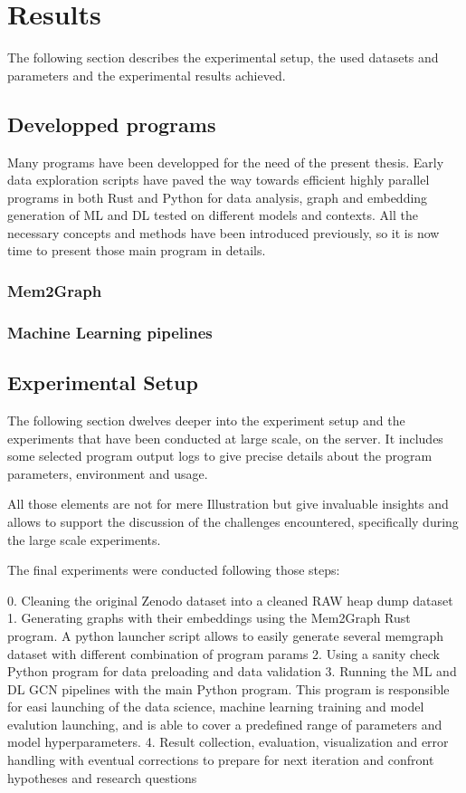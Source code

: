 \chapter{Results}\label{chap:results}

The following section describes the experimental setup, the used datasets and parameters and the experimental results achieved.

\section{Developped programs}
Many programs have been developped for the need of the present thesis. Early data exploration scripts have paved the way towards efficient highly parallel programs in both Rust and Python for data analysis, graph and embedding generation of ML and DL tested on different models and contexts. All the necessary concepts and methods have been introduced previously, so it is now time to present those main program in details.

\subsection{Mem2Graph}

\subsection{Machine Learning pipelines}

\section{Experimental Setup}
The following section dwelves deeper into the experiment setup and the experiments that have been conducted at large scale, on the server. It includes some selected program output logs to give precise details about the program parameters, environment and usage. 

All those elements are not for mere Illustration but give invaluable insights and allows to support the discussion of the challenges encountered, specifically during the large scale experiments.

The final experiments were conducted following those steps:

0. Cleaning the original Zenodo dataset into a cleaned RAW heap dump dataset
1. Generating graphs with their embeddings using the Mem2Graph Rust program. A python launcher script allows to easily generate several memgraph dataset with different combination of program params
2. Using a sanity check Python program for data preloading and data validation
3. Running the ML and DL GCN pipelines with the main Python program. This program is responsible for easi launching of the data science, machine learning training and model evalution launching, and is able to cover a predefined range of parameters and model hyperparameters.
4. Result collection, evaluation, visualization and error handling with eventual corrections to prepare for next iteration and confront hypotheses and research questions

